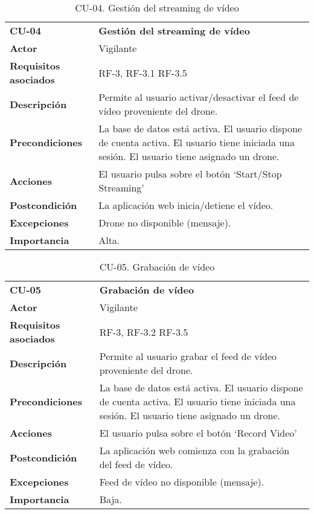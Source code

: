 \begin{table}[H]
	\begin{center}
		\begin{tabular}{m{3cm} | m{10cm}}\hline
			\toprule
			\textbf{CU-04} & \textbf{Gestión del streaming de vídeo}\\
			\otoprule
			\textbf{Actor} & Vigilante\\
			\textbf{Requisitos asociados} & RF-3, RF-3.1 RF-3.5\\
			\textbf{Descripción} & Permite al usuario activar/desactivar el feed de vídeo proveniente del drone.\\
			\textbf{Precondiciones} & La base de datos está activa. El usuario dispone de cuenta activa. El usuario tiene iniciada una sesión. El usuario tiene asignado un drone.\\
			\textbf{Acciones} & \item El usuario pulsa sobre el botón `Start/Stop Streaming'\\
			
			\textbf{Postcondición} & La aplicación web inicia/detiene el vídeo.\\
			\textbf{Excepciones} &  Drone no disponible (mensaje).\\
			\textbf{Importancia} & Alta.\\
			\hline
			\bottomrule
		\end{tabular}
		\caption{CU-04. Gestión del streaming de vídeo}
		\label{tb:CU04}
	\end{center}
\end{table}


\begin{table}[H]
	\begin{center}
		\begin{tabular}{m{3cm} | m{10cm}}\hline
			\toprule
			\textbf{CU-05} & \textbf{Grabación de vídeo}\\
			\otoprule
			\textbf{Actor} & Vigilante\\
			\textbf{Requisitos asociados} & RF-3, RF-3.2 RF-3.5\\
			\textbf{Descripción} & Permite al usuario grabar el feed de vídeo proveniente del drone.\\
			\textbf{Precondiciones} & La base de datos está activa. El usuario dispone de cuenta activa. El usuario tiene iniciada una sesión. El usuario tiene asignado un drone.\\
			\textbf{Acciones} & \item El usuario pulsa sobre el botón `Record Video'\\
			
			\textbf{Postcondición} & La aplicación web comienza con la grabación del feed de vídeo.\\
			\textbf{Excepciones} &\item Feed de vídeo no disponible (mensaje).\\
			\textbf{Importancia} & Baja.\\
			\hline
			\bottomrule
		\end{tabular}
		\caption{CU-05. Grabación de vídeo}
		\label{tb:CU05}
	\end{center}
\end{table}

